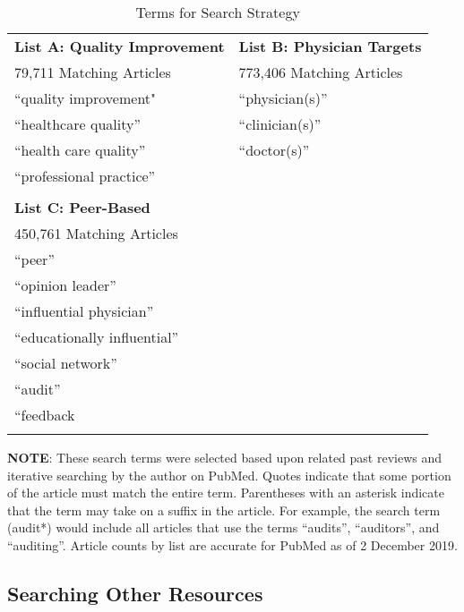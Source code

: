 \documentclass[12pt]{article}
\begin{document}
\begin{table}
  \centering
  \caption{Terms for Search Strategy}
  \begin{center}
  \begin{threeparttable}
\begin{tabular}{|l|l|}
  \hline
  \textbf{List A: Quality Improvement} & \textbf{List B: Physician Targets} \\
  79,711 Matching Articles & 773,406 Matching Articles\\
  \hline
  ``quality improvement" & ``physician(s)'' \\
  ``healthcare quality'' & ``clinician(s)'' \\
  ``health care quality'' & ``doctor(s)'' \\
  ``professional practice'' & \\
  & \\
  \hline
  \textbf{List C: Peer-Based} & \\
  450,761 Matching Articles & \\
  \hline
  ``peer'' & \\
  ``opinion leader'' & \\
  ``influential physician'' & \\
  ``educationally influential'' & \\
  ``social network'' & \\
  ``audit'' & \\
  ``feedback & \\
  & \\
   \hline
\end{tabular}
\begin{tablenotes}
  \footnotesize
\textbf{NOTE}: These search terms were selected based upon related past reviews and iterative searching by the author on PubMed. Quotes indicate that some portion of the article must match the entire term. Parentheses with an asterisk indicate that the term may take on a suffix in the article. For example, the search term (audit*) would include all articles that use the terms ``audits'', ``auditors'', and ``auditing''. Article counts by list are accurate for PubMed as of 2 December 2019.
\end{tablenotes}
\end{threeparttable}
\end{center}
\label{tab:SearchTerms}
\end{table}


\subsection{Searching Other Resources}
\end{document}
